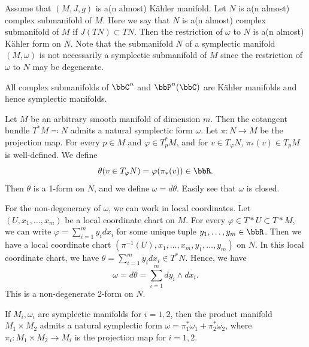     Assume that \((M, J, g)\) is a(n almost) K\"ahler manifold. 
    Let \(N\) is a(n almost) complex submanifold of \(M\). 
    Here we say that \(N\) is a(n almost) complex submanifold of \(M\) if \(J(TN) \subset TN\).
    Then the restriction of \(\omega\) to \(N\) is a(n almost) K\"ahler form on \(N\).
    Note that the submanifold \(N\) of a symplectic manifold \((M, \omega)\) is not necessarily a symplectic submanifold of \(M\) 
    since the restriction of \(\omega\) to \(N\) may be degenerate.

    \begin{example}
        All complex submanifolds of \(\bbC^n\) and \(\bbP^n(\bbC)\) are K\"ahler manifolds and hence symplectic manifolds.
    \end{example}

    \begin{example}
        Let \(M\) be an arbitrary smooth manifold of dimension \(m\).
        Then the cotangent bundle \(T^*M \eqqcolon N\) admits a natural symplectic form \(\omega\).
        Let \(\pi: N \to M\) be the projection map.
        For every \(p \in M\) and \(\varphi \in T^*_pM\), and for \(v \in T_\varphi N\), \(\pi_*(v) \in T_pM\) is well-defined.
        We define 
        \[ \theta(v\in T_\varphi N) = \varphi(\pi_*(v)) \in \bbR. \]
        Then \(\theta\) is a 1-form on \(N\), and we define \(\omega = d\theta\).
        Easily see that \(\omega\) is closed.

        For the non-degeneracy of \(\omega\), we can work in local coordinates.
        Let \((U, x_1, \ldots, x_m)\) be a local coordinate chart on \(M\). 
        For every \(\varphi \in T*U \subset T*M\), we can write \(\varphi = \sum_{i=1}^m y_i dx_i\) for some unique tuple \(y_1, \ldots, y_m \in \bbR\).
        Then we have a local coordinate chart \((\pi^{-1}(U), x_1, \ldots, x_m, y_1, \ldots, y_m)\) on \(N\).
        In this local coordinate chart, we have \(\theta = \sum_{i=1}^m y_i dx_i \in T^*N\).
        Hence, we have
        \[ \omega = d\theta = \sum_{i=1}^m dy_i \wedge dx_i. \]
        This is a non-degenerate 2-form on \(N\).
    \end{example}

    \begin{example}
        If \(M_i, \omega_i\) are symplectic manifolds for \(i=1,2\), then the product manifold \(M_1 \times M_2\) admits a natural symplectic form \(\omega = \pi_1^*\omega_1 + \pi_2^*\omega_2\), 
        where \(\pi_i: M_1 \times M_2 \to M_i\) is the projection map for \(i=1,2\).
    \end{example}




